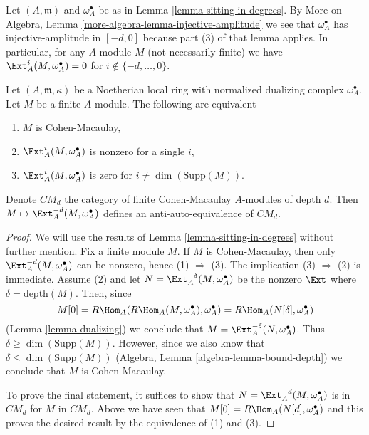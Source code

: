 \begin{remark}
\label{remark-vanishing-for-arbitrary-modules}
Let $(A, \mathfrak m)$ and $\omega_A^\bullet$ be as in
Lemma \ref{lemma-sitting-in-degrees}.
By More on Algebra, Lemma \ref{more-algebra-lemma-injective-amplitude}
we see that $\omega_A^\bullet$ has injective-amplitude in $[-d, 0]$
because part (3) of that lemma applies.
In particular, for any $A$-module $M$ (not necessarily finite) we have
$\Ext^i_A(M, \omega_A^\bullet) = 0$ for $i \not \in \{-d, \ldots, 0\}$.
\end{remark}

\begin{lemma}
\label{lemma-local-CM}
Let $(A, \mathfrak m, \kappa)$ be a Noetherian local ring
with normalized dualizing complex $\omega_A^\bullet$. Let $M$
be a finite $A$-module. The following are equivalent
\begin{enumerate}
\item $M$ is Cohen-Macaulay,
\item $\Ext^i_A(M, \omega_A^\bullet)$ is nonzero for a single $i$,
\item $\Ext^i_A(M, \omega_A^\bullet)$ is zero for
$i \not = \dim(\text{Supp}(M))$.
\end{enumerate}
Denote $CM_d$ the category of finite Cohen-Macaulay $A$-modules
of depth $d$. Then $M \mapsto \Ext^{-d}_A(M, \omega_A^\bullet)$
defines an anti-auto-equivalence of $CM_d$.
\end{lemma}

\begin{proof}
We will use the results of Lemma \ref{lemma-sitting-in-degrees}
without further mention. Fix a finite module $M$.
If $M$ is Cohen-Macaulay, then only
$\Ext^{-d}_A(M, \omega_A^\bullet)$ can be nonzero,
hence (1) $\Rightarrow$ (3).
The implication (3) $\Rightarrow$ (2) is immediate.
Assume (2) and let $N = \Ext^{-\delta}_A(M, \omega_A^\bullet)$
be the nonzero $\Ext$ where $\delta = \text{depth}(M)$. Then, since
$$
M[0] = R\Hom_A(R\Hom_A(M, \omega_A^\bullet), \omega_A^\bullet) =
R\Hom_A(N[\delta], \omega_A^\bullet)
$$
(Lemma \ref{lemma-dualizing})
we conclude that $M = \Ext_A^{-\delta}(N, \omega_A^\bullet)$.
Thus $\delta \geq \dim(\text{Supp}(M))$. However,
since we also know that $\delta \leq \dim(\text{Supp}(M))$
(Algebra, Lemma \ref{algebra-lemma-bound-depth}) we conclude that $M$ is
Cohen-Macaulay.

\medskip\noindent
To prove the final statement, it suffices to show that
$N = \Ext^{-d}_A(M, \omega_A^\bullet)$ is in $CM_d$
for $M$ in $CM_d$. Above we have seen that
$M[0] = R\Hom_A(N[d], \omega_A^\bullet)$ and this proves the
desired result by the equivalence of (1) and (3).
\end{proof}

